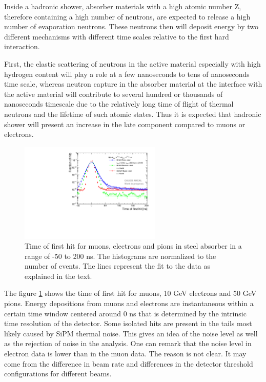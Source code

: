 Inside a hadronic shower, absorber materials with a high atomic number Z, therefore containing a high number of neutrons, are expected to release a high number of evaporation neutrons. These neutrons then will deposit energy by two different mechanisms with different time scales relative to the first hard interaction.

First, the elastic scattering of neutrons in the active material especially with high hydrogen content will play a role at a few nanoseconds to tens of nanoseconds time scale, whereas neutron capture in the absorber material at the interface with the active material will contribute to several hundred or thousands of nanoseconds timescale due to the relatively long time of flight of thermal neutrons and the lifetime of such atomic states. Thus it is expected that hadronic shower will present an increase in the late component compared to muons or electrons.

\begin{figure}[htbp!]
	\centering
	\includegraphics[width=0.6\textwidth]{../Thesis_Plots/Timing/Pions/Plots/Timing_dNdt_Comparison.pdf}
	\caption{Time of first hit for muons, electrons and pions in steel absorber in a range of -50 to 200 ns. The histograms are normalized to the number of events. The lines represent the fit to the data as explained in the text.}
	\label{fig:dNdt_Comparison}
\end{figure}

The figure \ref{fig:dNdt_Comparison} shows the time of first hit for muons, 10 GeV electrons and 50 GeV pions. Energy depositions from muons and electrons are instantaneous within a certain time window centered around 0 ns that is determined by the intrinsic time resolution of the detector. Some isolated hits are present in the tails most likely caused by SiPM thermal noise. This gives an idea of the noise level as well as the rejection of noise in the analysis. One can remark that the noise level in electron data is lower than in the muon data. The reason is not clear. It may come from the difference in beam rate and differences in the detector threshold configurations for different beams.

